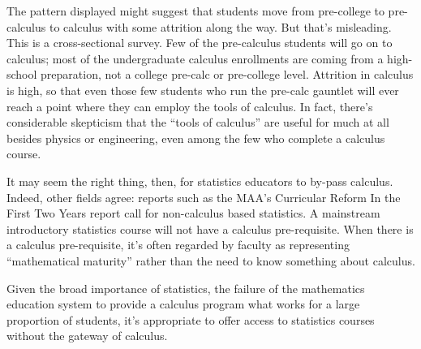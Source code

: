 The pattern displayed might suggest that students move from pre-college to pre-calculus to calculus with some attrition along the way.  But that's misleading.  This is a cross-sectional survey.  Few of the pre-calculus students will go on to calculus; most of the undergraduate calculus enrollments are coming from a high-school preparation, not a college pre-calc or pre-college level.  Attrition in calculus is high, so that even those few students who run the pre-calc gauntlet will ever reach a point where they can employ the tools of calculus.  In fact, there's considerable skepticism that the ``tools of calculus'' are useful for much at all besides physics or engineering, even among the few who complete a calculus course.

It may seem the right thing, then, for statistics educators to by-pass calculus.  Indeed, other fields agree: reports such as the MAA's Curricular Reform In the First Two Years report call for non-calculus based statistics.  A mainstream introductory statistics course will not have a calculus pre-requisite.  When there is a calculus pre-requisite, it's often regarded by faculty as representing ``mathematical maturity'' rather than the need to know something about calculus.

Given the broad importance of statistics, the failure of the mathematics education system to provide a calculus program what works for a large proportion of students, it's appropriate to offer access to statistics courses without the gateway of calculus.  



